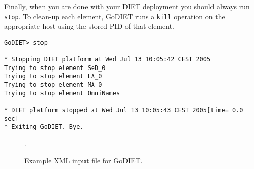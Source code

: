 Finally, when you are done with your DIET deployment you should always run 
\texttt{stop}.  To clean-up each element, GoDIET runs a \texttt{kill}
operation on the appropriate host using the stored PID of that element.

\begin{verbatim}
GoDIET> stop

* Stopping DIET platform at Wed Jul 13 10:05:42 CEST 2005
Trying to stop element SeD_0
Trying to stop element LA_0
Trying to stop element MA_0
Trying to stop element OmniNames

* DIET platform stopped at Wed Jul 13 10:05:43 CEST 2005[time= 0.0 sec]
* Exiting GoDIET. Bye.
\end{verbatim}

\begin{figure}[p]
.
\caption{Example XML input file for GoDIET.\label{fig:godietXml}}
\end{figure}







